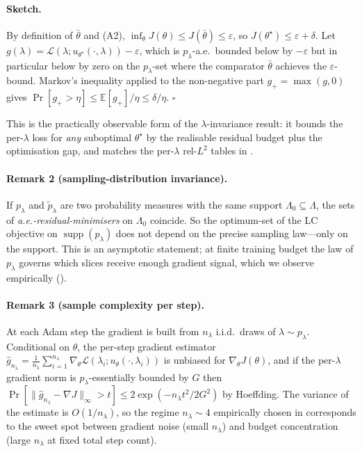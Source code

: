 \documentclass{article}
\theoremstyle{plain}
\theoremstyle{definition}
\theoremstyle{remark}
\begin{document}
\paragraph{Sketch.}
By definition of $\bar\theta$ and (A2),
$\inf_\theta J(\theta) \le J(\bar\theta) \le \varepsilon$, so
$J(\theta^\star) \le \varepsilon + \delta$. Let
$g(\lambda) = \mathcal{L}(\lambda; u_{\theta^\star}(\cdot,\lambda)) -
\varepsilon$, which is $p_\lambda$-a.e.\ bounded below by
$-\varepsilon$ but in particular below by zero on the
$p_\lambda$-set where the comparator $\bar\theta$ achieves the
$\varepsilon$-bound. Markov's inequality applied to the
non-negative part $g_+ = \max(g, 0)$ gives
$\Pr[g_+ > \eta] \le \mathbb{E}[g_+]/\eta \le \delta/\eta$.
\hfill$\square$

This is the practically observable form of the
$\lambda$-invariance result: it bounds the per-$\lambda$ loss for
\emph{any} suboptimal $\theta^\star$ by the realisable residual
budget plus the optimisation gap, and matches the per-$\lambda$
rel-$L^2$ tables in .

\paragraph{Remark 2 (sampling-distribution invariance).}
If $p_\lambda$ and $\tilde p_\lambda$ are two probability measures
with the same support $\Lambda_0 \subseteq \Lambda$, the sets of
\emph{a.e.-residual-minimisers} on $\Lambda_0$ coincide. So the
optimum-set of the LC objective on $\operatorname{supp}(p_\lambda)$
does not depend on the precise sampling law---only on the support.
This is an asymptotic statement; at finite training budget the law
of $p_\lambda$ governs which slices receive enough gradient signal,
which we observe empirically ().

\paragraph{Remark 3 (sample complexity per step).}
\label{rem:sample}
At each Adam step the gradient is built from $n_\lambda$ i.i.d.\
draws of $\lambda \sim p_\lambda$. Conditional on $\theta$, the
per-step gradient estimator
$\hat g_{n_\lambda} = \frac{1}{n_\lambda}\sum_{i=1}^{n_\lambda}
\nabla_\theta \mathcal{L}(\lambda_i; u_\theta(\cdot,\lambda_i))$
is unbiased for $\nabla_\theta J(\theta)$, and if the per-$\lambda$
gradient norm is $p_\lambda$-essentially bounded by $G$ then
$\Pr[\| \hat g_{n_\lambda} - \nabla J \|_\infty > t] \le
2 \exp(-n_\lambda t^2 / 2 G^2)$ by Hoeffding. The variance of the
estimate is $O(1/n_\lambda)$, so the regime $n_\lambda \!\sim\! 4$
empirically chosen in \Cref{sec:results-ablations} corresponds to
the sweet spot between gradient noise (small $n_\lambda$) and
budget concentration (large $n_\lambda$ at fixed total step count).
\end{document}
